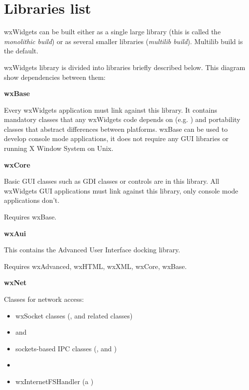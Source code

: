 \chapter{Libraries list}\label{librarieslist}
%
\setfooter{\thepage}{}{}{}{}{\thepage}%

wxWidgets can be built either as a single large
library (this is called the {\it monolithic build}) or as several smaller
libraries ({\it multilib build}). Multilib build is the default.

wxWidgets library is divided into libraries briefly described below. This
diagram show dependencies between them:

\begin{center}
\end{center}

{\large {\bf wxBase}}

Every wxWidgets application must link against this library. It contains
mandatory classes that any wxWidgets code depends on (e.g.
 ) and portability classes that abstract
differences between platforms. wxBase can be used to develop console mode
applications, it does not require any GUI libraries or running X Window System
on Unix.

{\large {\bf wxCore}}

Basic GUI classes such as GDI classes or controls are in this library. All
wxWidgets GUI applications must link against this library, only console mode
applications don't.

Requires wxBase.

{\large {\bf wxAui}}

This contains the Advanced User Interface docking library.

Requires wxAdvanced, wxHTML, wxXML, wxCore, wxBase.

{\large {\bf wxNet}}

Classes for network access:

\begin{itemize}
\item{ wxSocket classes (,
  and related classes) }
\item{  and
  }
\item{ sockets-based IPC classes (,
  and
 ) }
\item{  }
\item{ wxInternetFSHandler (a ) }
\end{itemize}

